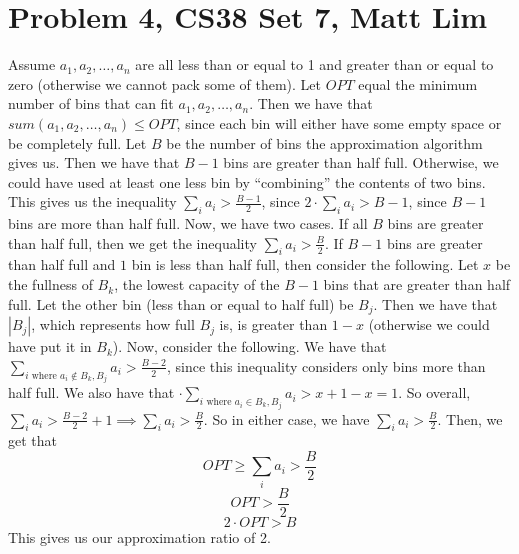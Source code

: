 \documentclass{article}
\begin{document}
\section*{Problem 4, CS38 Set 7, Matt Lim}
Assume $a_1, a_2, \dots, a_n$ are all less than or equal to 1 and greater than
or equal to zero (otherwise we cannot pack some of them).
Let $OPT$ equal the minimum number of bins that can fit $a_1, a_2, \dots, a_n$.
Then we have that $sum(a_1, a_2, \dots, a_n) \leq OPT$, since each bin will
either have some empty space or be completely full.
Let $B$ be the number of bins the approximation algorithm
gives us. Then we have that $B-1$ bins are greater than half full. Otherwise, we
could have used at least one less bin by ``combining'' the contents of two bins.
This gives us the inequality $\sum_i a_i > \frac{B-1}{2}$, since $2 \cdot \sum_i a_i
> B - 1$, since $B-1$ bins are more than half full. Now, we have two cases. If
all $B$ bins are greater than half full, then we get the inequality
$\sum_i a_i > \frac{B}{2}$. If $B-1$ bins are greater than half full
and $1$ bin is less than half full, then consider the following. Let $x$ be the
fullness of $B_k$, the lowest capacity of the $B-1$ bins that are greater than half full.
Let the other bin (less than or equal to half full) be $B_j$. Then we have
that $|B_j|$, which represents how full $B_j$ is, is
greater than $1-x$ (otherwise we could have put it in $B_k$). Now, consider the following.
We have that $\sum_{i \text{ where $a_i \notin B_k,B_j$}} a_i > \frac{B-2}{2}$,
since this inequality considers only bins more than half full. We also have that
$\cdot \sum_{i \text{ where $a_i \in B_k, B_j$}} a_i > x + 1 - x = 1$. So overall,
$\sum_{i} a_i > \frac{B-2}{2} + 1
\implies \sum_{i} a_i > \frac{B}{2}$. So in either case, we have $\sum_{i} a_i >
\frac{B}{2}$. Then, we get that
\[ OPT \geq \sum_i a_i > \frac{B}{2} \]
\[ OPT > \frac{B}{2} \]
\[ 2 \cdot OPT > B \]
This gives us our approximation ratio of 2.
\newpage

\end{document}
